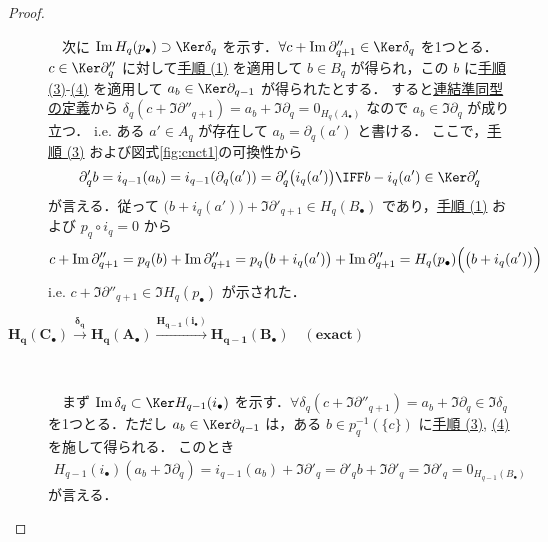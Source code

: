 \documentclass[algtopo_main]{subfiles}
\begin{document}
\begin{proof}
\begin{description}
    　次に $\Im H_q(p_\bullet) \supset \Ker \delta_q$ を示す．$\forall c + \Im \partial''_{q+1} \in \Ker \delta_q$ を1つとる．
    $c \in \Ker \partial''_q$ に対して\hyperref[pro:1]{手順 (1)} を適用して $b \in B_q$ が得られ，この $b$ に\hyperref[pro:3]{手順 (3)}-\hyperref[pro:4]{(4)} を適用して $a_b \in \Ker \partial_{q-1}$ が得られたとする．
    すると\hyperref[lem:def:connecting]{連結準同型の定義}から $\delta_q(c + \Im \partial''_{q+1}) = a_b + \Im \partial_q = 0_{H_q(A_\bullet)}$ なので $a_b \in \Im \partial_q$ が成り立つ．
    i.e. ある $a' \in A_{q}$ が存在して $a_b = \partial_q(a')$ と書ける．
    ここで，\hyperref[pro:3]{手順 (3)} および図式\ref{fig:cnct1}の可換性から
    \begin{align}
        \partial'_q b = i_{q-1}(a_b) = i_{q-1} (\partial_q(a')) = \partial'_q \bigl( i_q(a') \bigr) \IFF b - i_q(a') \in \Ker \partial'_q
    \end{align}
    が言える．従って $\bigl( b + i_q(a') \bigr) + \Im \partial'_{q+1} \in H_q(B_\bullet)$ であり，\hyperref[pro:1]{手順 (1)} および $p_q \circ i_q = 0$ から
    \begin{align}
        c + \Im \partial''_{q+1} = p_q(b) + \Im \partial''_{q+1} = p_q\bigl( b + i_q(a') \bigr) + \Im \partial''_{q+1} = H_q (p_\bullet)\Bigl( \bigl( b + i_q(a') \bigr) \Bigr)
    \end{align}
    i.e. $c + \Im \partial''_{q+1} \in \Im H_q(p_\bullet)$ が示された．

    \item[$\bm{H_q(C_\bullet) \xrightarrow{\delta_q} H_q(A_\bullet) \xrightarrow{H_{q-1}(i_\bullet)} H_{q-1}(B_\bullet) \quad (\text{exact})}$]　
    
    　まず $\Im \delta_q \subset \Ker H_{q-1}(i_\bullet)$ を示す．$\forall \delta_q(c + \Im \partial''_{q+1}) = a_b + \Im \partial_q \in \Im \delta_q$ を1つとる．ただし $a_b \in \Ker \partial_{q-1}$ は，ある $b \in p_{q}^{-1}(\{c\})$ に\hyperref[pro:3]{手順 (3)}, \hyperref[pro:4]{(4)} を施して得られる．
    このとき
    \begin{align}
        H_{q-1}(i_\bullet) ( a_b + \Im \partial_q ) = i_{q-1}(a_b) + \Im \partial'_q = \partial'_q b + \Im \partial'_q = \Im \partial'_q = 0_{H_{q-1}(B_\bullet)}
    \end{align}
    が言える．


\end{description}
\end{proof}
\end{document}
